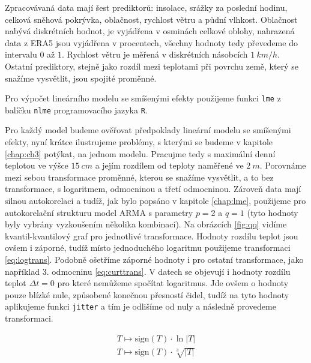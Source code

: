 Zpracovávaná data mají šest prediktorů: insolace, srážky za poslední hodinu, celková sněhová pokrývka, oblačnost, rychlost větru a půdní vlhkost. Oblačnost nabývá diskrétních hodnot, je vyjádřena v osminách celkové oblohy, nahrazená data z ERA5 jsou vyjádřena v procentech, všechny hodnoty tedy převedeme do intervalu $0$ až $1$. Rychlost větru je měřená v diskrétních násobcích $\SI{1}{km/h}$. Ostatní prediktory, stejně jako rozdíl mezi teplotami při povrchu země, který se snažíme vysvětlit, jsou spojité proměnné. 

Pro výpočet lineárního modelu se smíšenými efekty použijeme funkci \texttt{lme} z balíčku \texttt{nlme} programovacího jazyka \texttt{R}.

Pro každý model budeme ověřovat předpoklady lineární modelu se smíšenými efekty, nyní krátce ilustrujeme problémy, s kterými se budeme v kapitole \ref{chap:ch3} potýkat, na jednom modelu. Pracujme tedy s maximální denní teplotou ve výšce $\SI{15}{cm}$ a jejím rozdílem od teploty naměřené ve $\SI{2}{m}$. Porovnáme mezi sebou transformace proměnné, kterou se snažíme vysvětlit, a to bez transformace, s logaritmem, odmocninou a třetí odmocninou. Zároveň data mají silnou autokorelaci a tudíž, jak bylo popsáno v kapitole \ref{chap:lme}, použijeme pro autokorelační strukturu model ARMA s parametry $p=2$ a $q=1$ (tyto hodnoty byly vybrány vyzkoušením několika kombinací). Na obrázcích \ref{fig:qq} vidíme kvantil-kvantilový graf pro jednotlivé transformace. Hodnoty rozdílu teplot jsou ovšem i záporné, tudíž místo jednoduchého logaritmu použijeme transformaci \eqref{eq:logtrans}. Podobně ošetříme záporné hodnoty i pro ostatní transformace, jako například 3. odmocninu \eqref{eq:curttrans}. V datech se objevují i hodnoty rozdílu teplot $\Delta t=0$ pro které nemůžeme spočítat logaritmus. Jde ovšem o hodnoty pouze blízké nule, způsobené konečnou přesností čidel, tudíž na tyto hodnoty aplikujeme funkci \texttt{jitter} a tím je odlišíme od nuly a následně provedeme transformaci.

\begin{gather*}
	T \mapsto \mathrm{sign}(T)\cdot \ln\left|T\right| \label{eq:logtrans}\\
	T \mapsto \mathrm{sign}(T)\cdot \sqrt[3]{\left|T\right|} \label{eq:curttrans}
\end{gather*}

